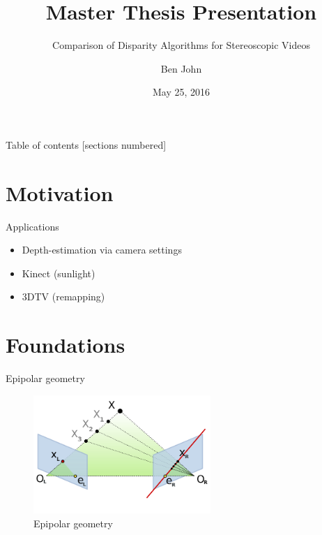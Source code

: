 \documentclass[10pt]{beamer}
\title{Master Thesis Presentation}
\subtitle{Comparison of Disparity Algorithms for Stereoscopic Videos}
\date{May 25, 2016}
\author{Ben John}
\institute{University of Mannheim, Department of Praktische Informatik IV}
\begin{document}
\maketitle
{}

\begin{frame}{Table of contents}
  [sections numbered]
  \tableofcontents[hideallsubsections]
\end{frame}

\section{Motivation}

\begin{frame}[fragile]{Applications}
  \begin{itemize}
    \item Depth-estimation via camera settings
    \item Kinect (sunlight)
    \item 3DTV (remapping)
  \end{itemize}
\end{frame}

\section{Foundations}

\begin{frame}[fragile]{Epipolar geometry}
  \begin{figure}[h!]
    \centering
    \includegraphics[width=0.6\textwidth]{../paper/src/images/epipolar.png}
    \caption[Epipolar geometry]{Epipolar geometry\protect\footnotemark}
  \end{figure}
\end{frame}
\end{document}
